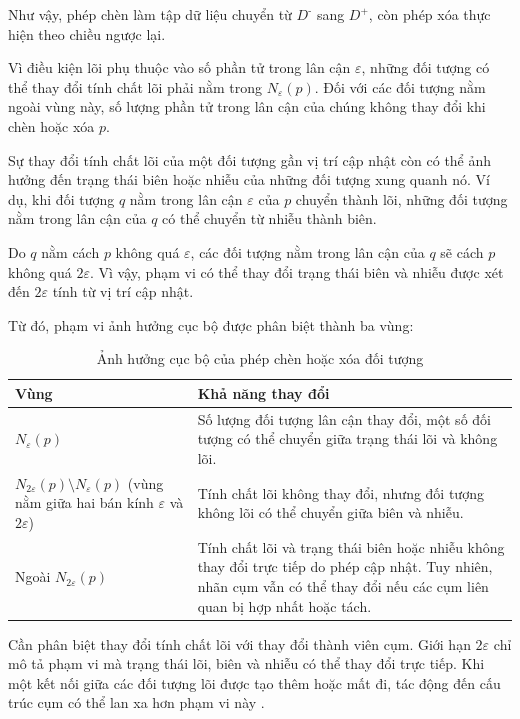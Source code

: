 Như vậy, phép chèn làm tập dữ liệu chuyển từ \(D^{\text{-}}\) sang \(D^{+}\), còn phép xóa thực hiện theo chiều ngược lại.

Vì điều kiện lõi phụ thuộc vào số phần tử trong lân cận \(\varepsilon\), những đối tượng có thể thay đổi tính chất lõi phải nằm trong \(N_{\varepsilon}(p)\). Đối với các đối tượng nằm ngoài vùng này, số lượng phần tử trong lân cận của chúng không thay đổi khi chèn hoặc xóa \(p\).

Sự thay đổi tính chất lõi của một đối tượng gần vị trí cập nhật còn có thể ảnh hưởng đến trạng thái biên hoặc nhiễu của những đối tượng xung quanh nó. Ví dụ, khi đối tượng \(q\) nằm trong lân cận \(\varepsilon\) của \(p\) chuyển thành lõi, những đối tượng nằm trong lân cận của \(q\) có thể chuyển từ nhiễu thành biên.

Do \(q\) nằm cách \(p\) không quá \(\varepsilon\), các đối tượng nằm trong lân cận của \(q\) sẽ cách \(p\) không quá \(2\varepsilon\). Vì vậy, phạm vi có thể thay đổi trạng thái biên và nhiễu được xét đến \(2\varepsilon\) tính từ vị trí cập nhật.

Từ đó, phạm vi ảnh hưởng cục bộ được phân biệt thành ba vùng:

\begin{table}[H]
\centering
\caption{Ảnh hưởng cục bộ của phép chèn hoặc xóa đối tượng}
\label{tab:incremental_local_effect}
\normalsize
\begin{tabularx}{\textwidth}{|P{3.5cm}|Y|}\hline
\textbf{Vùng} & \textbf{Khả năng thay đổi} \\\hline
\(N_{\varepsilon}(p)\) &
Số lượng đối tượng lân cận thay đổi, một số đối tượng có thể chuyển giữa trạng thái lõi và không lõi. \\\hline
\(N_{2\varepsilon}(p)\setminus N_{\varepsilon}(p)\) (vùng nằm giữa hai bán kính \(\varepsilon\) và \(2\varepsilon\)) &
Tính chất lõi không thay đổi, nhưng đối tượng không lõi có thể chuyển giữa biên và nhiễu. \\\hline
Ngoài \(N_{2\varepsilon}(p)\) &
Tính chất lõi và trạng thái biên hoặc nhiễu không thay đổi trực tiếp do phép cập nhật. Tuy nhiên, nhãn cụm vẫn có thể thay đổi nếu các cụm liên quan bị hợp nhất hoặc tách. \\\hline
\end{tabularx}
\end{table}

Cần phân biệt thay đổi tính chất lõi với thay đổi thành viên cụm. Giới hạn \(2\varepsilon\) chỉ mô tả phạm vi mà trạng thái lõi, biên và nhiễu có thể thay đổi trực tiếp. Khi một kết nối giữa các đối tượng lõi được tạo thêm hoặc mất đi, tác động đến cấu trúc cụm có thể lan xa hơn phạm vi này \parencite{ester1998incrementaldbscan}.


